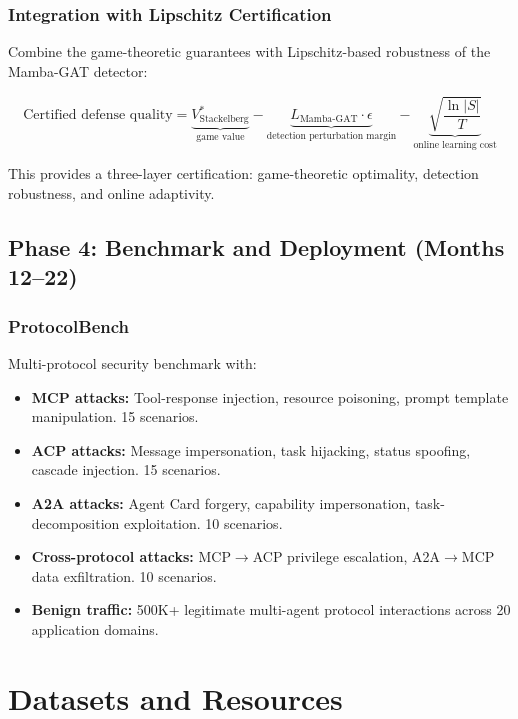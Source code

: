 \documentclass[12pt,a4paper]{article}
\begin{document}
\subsubsection{Integration with Lipschitz Certification}

Combine the game-theoretic guarantees with Lipschitz-based robustness of the Mamba-GAT detector:

\begin{equation}
    \text{Certified defense quality} = \underbrace{V^*_{\text{Stackelberg}}}_{\text{game value}} - \underbrace{L_{\text{Mamba-GAT}} \cdot \epsilon}_{\text{detection perturbation margin}} - \underbrace{\sqrt{\frac{\ln |S|}{T}}}_{\text{online learning cost}}
\end{equation}

This provides a three-layer certification: game-theoretic optimality, detection robustness, and online adaptivity.

\subsection{Phase 4: Benchmark and Deployment (Months 12--22)}

\subsubsection{ProtocolBench}

Multi-protocol security benchmark with:

\begin{itemize}
    \item \textbf{MCP attacks:} Tool-response injection, resource poisoning, prompt template manipulation. 15 scenarios.
    \item \textbf{ACP attacks:} Message impersonation, task hijacking, status spoofing, cascade injection. 15 scenarios.
    \item \textbf{A2A attacks:} Agent Card forgery, capability impersonation, task-decomposition exploitation. 10 scenarios.
    \item \textbf{Cross-protocol attacks:} MCP$\to$ACP privilege escalation, A2A$\to$MCP data exfiltration. 10 scenarios.
    \item \textbf{Benign traffic:} 500K+ legitimate multi-agent protocol interactions across 20 application domains.
\end{itemize}

\section{Datasets and Resources}
\end{document}
